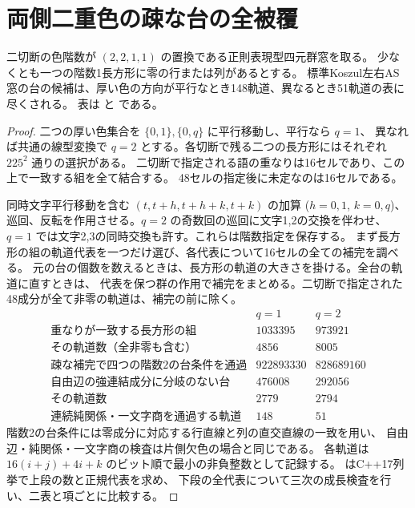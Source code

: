 \section{両側二重色の疎な台の全被覆}
\label{sec:klein-two-doublet-supports}
\begin{proposition}\label{prop:klein-two-doublet-supports}
二切断の色階数が $(2,2,1,1)$ の置換である正則表現型四元群窓を取る。
少なくとも一つの階数1長方形に零の行または列があるとする。
標準Koszul左右AS窓の台の候補は、厚い色の方向が平行なとき148軌道、異なるとき51軌道の表に尽くされる。
表は  と
 である。
\end{proposition}
\begin{proof}
二つの厚い色集合を $\{0,1\},\{0,q\}$ に平行移動し、平行なら $q=1$、
異なれば共通の線型変換で $q=2$ とする。各切断で残る二つの長方形にはそれぞれ $225^2$ 通りの選択がある。
二切断で指定される語の重なりは16セルであり、この上で一致する組を全て結合する。
48セルの指定後に未定なのは16セルである。

同時文字平行移動を含む $(t,t+h,t+h+k,t+k)$ の加算 ($h=0,1$, $k=0,q$)、
巡回、反転を作用させる。$q=2$ の奇数回の巡回に文字1,2の交換を伴わせ、
$q=1$ では文字2,3の同時交換も許す。これらは階数指定を保存する。
まず長方形の組の軌道代表を一つだけ選び、各代表について16セルの全ての補完を調べる。
元の台の個数を数えるときは、長方形の軌道の大きさを掛ける。全台の軌道に直すときは、
代表を保つ群の作用で補完をまとめる。二切断で指定された48成分が全て非零の軌道は、補完の前に除く。
\[
\begin{array}{c|rr}
 & q=1&q=2\\\hline
重なりが一致する長方形の組 & 1033395 & 973921\\
その軌道数（全非零も含む） &4856&8005\\
疎な補完で四つの階数2の台条件を通過&922893330&828689160\\
自由辺の強連結成分に分岐のない台&476008&292056\\
その軌道数&2779&2794\\
連続純関係・一文字商を通過する軌道&148&51
\end{array}
\]
階数2の台条件には零成分に対応する行直線と列の直交直線の一致を用い、
自由辺・純関係・一文字商の検査は片側欠色の場合と同じである。
各軌道は $16(i+j)+4i+k$ のビット順で最小の非負整数として記録する。
 はC++17列挙で上段の数と正規代表を求め、
下段の全代表について三次の成長検査を行い、二表と項ごとに比較する。
\end{proof}
